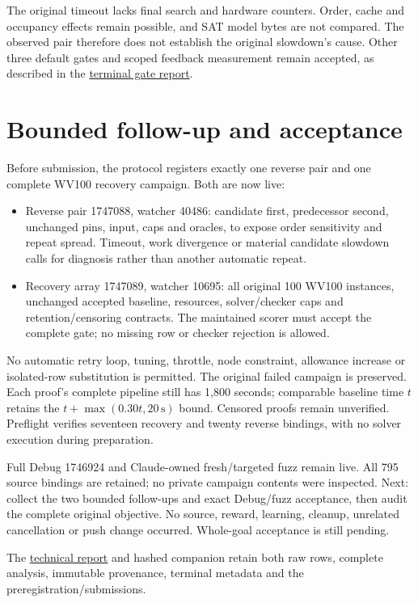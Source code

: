 \documentclass[11pt]{article}
\begin{document}
The original timeout lacks final search and hardware counters. Order, cache
and occupancy effects remain possible, and SAT model bytes are not compared.
The observed pair therefore does not establish the original slowdown's cause.
Other three default gates and scoped feedback measurement remain accepted,
as described in the
\href{../../benchmarks/reports/2026-10-03-terminal-substitute-regression-loss.md}{terminal gate report}.

\section*{Bounded follow-up and acceptance}
Before submission, the protocol registers exactly one reverse pair and one
complete WV100 recovery campaign. Both are now live:
\begin{itemize}
\item Reverse pair 1747088, watcher 40486: candidate first, predecessor second,
  unchanged pins, input, caps and oracles, to expose order sensitivity and repeat
  spread. Timeout, work divergence or material candidate slowdown calls for
  diagnosis rather than another automatic repeat.
\item Recovery array 1747089, watcher 10695: all original 100 WV100 instances,
  unchanged accepted baseline, resources, solver/checker caps and
  retention/censoring contracts. The maintained scorer must accept the
  complete gate; no missing row or checker rejection is allowed.
\end{itemize}
No automatic retry loop, tuning, throttle, node constraint, allowance increase
or isolated-row substitution is permitted. The original failed campaign is
preserved. Each proof's complete pipeline still has 1,800 seconds; comparable
baseline time $t$ retains the $t+\max(0.30t,20\,\mathrm{s})$ bound. Censored
proofs remain unverified. Preflight verifies seventeen recovery and twenty
reverse bindings, with no solver execution during preparation.

Full Debug 1746924 and Claude-owned fresh/targeted fuzz remain live. All 795
source bindings are retained; no private campaign contents were inspected.
Next: collect the two bounded follow-ups and exact Debug/fuzz acceptance,
then audit the complete original objective. No source, reward, learning,
cleanup, unrelated cancellation or push change occurred. Whole-goal
acceptance is still pending.

The
\href{../../benchmarks/reports/2026-10-03-snw16-matched-retention-diagnosis.md}{technical report}
and hashed companion retain both raw rows, complete analysis, immutable
provenance, terminal metadata and the preregistration/submissions.
\end{document}
